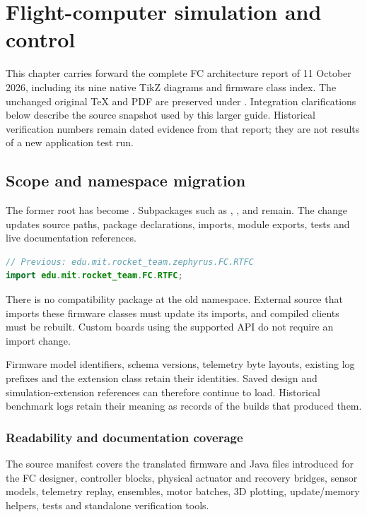 \chapter{Flight-computer simulation and control}\label{ch:fc}
This chapter carries forward the complete FC architecture report of 11 October 2026, including its nine native TikZ diagrams and firmware class index. The unchanged original TeX and PDF are preserved under . Integration clarifications below describe the source snapshot used by this larger guide. Historical verification numbers remain dated evidence from that report; they are not results of a new application test run.

\section{Scope and namespace migration}
The former  root has become
. Subpackages such as , ,
 and  remain. The change updates source paths,
package declarations, imports, module exports, tests and live documentation references.

\begin{lstlisting}[language=Java]
// Previous: edu.mit.rocket_team.zephyrus.FC.RTFC
import edu.mit.rocket_team.FC.RTFC;
\end{lstlisting}

There is no compatibility package at the old namespace. External source that
imports these firmware classes must update its imports, and compiled clients
must be rebuilt. Custom boards using the supported API
do not require an import change.

Firmware model identifiers,  schema versions, telemetry byte layouts,
existing log prefixes and the extension class 
retain their identities. Saved design and simulation-extension references can
therefore continue to load. Historical benchmark logs retain their meaning as
records of the builds that produced them.

\subsection{Readability and documentation coverage}
The source manifest covers the translated firmware and Java files introduced
for the FC designer, controller blocks, physical actuator and recovery bridges,
sensor models, telemetry replay, ensembles, motor batches, 3D plotting,
update/memory helpers, tests and standalone verification tools.

